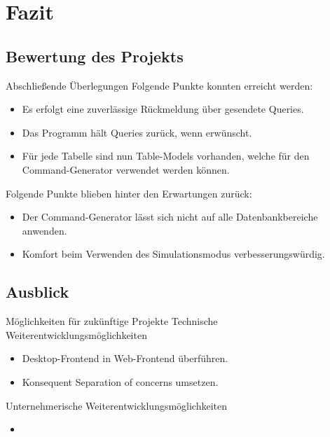 \documentclass[toc]{beamer}
\begin{document}
\section{Fazit}
    \subsection{Bewertung des Projekts}
        \begin{frame}{Abschließende Überlegungen}
            Folgende Punkte konnten erreicht werden:
                \begin{itemize}
                    \item Es erfolgt eine zuverlässige Rückmeldung über gesendete Queries.
                    \item Das Programm hält Queries zurück, wenn erwünscht.
                    \item Für jede Tabelle sind nun Table-Models vorhanden, welche für den Command-Generator verwendet werden können.
                \end{itemize}
            Folgende Punkte blieben hinter den Erwartungen zurück:
                \begin{itemize}
                    \item Der Command-Generator lässt sich nicht auf alle Datenbankbereiche anwenden.
                    \item Komfort beim Verwenden des Simulationsmodus verbesserungswürdig.
                \end{itemize}
            
    \end{frame}
    
    \subsection{Ausblick}
        \begin{frame}{Möglichkeiten für zukünftige Projekte}
            Technische Weiterentwicklungsmöglichkeiten
                 \begin{itemize}
                     \item Desktop-Frontend in Web-Frontend überführen.
                     \item Konsequent \glqq Separation of concerns\grqq{} umsetzen.
                 \end{itemize}
            Unternehmerische Weiterentwicklungsmöglichkeiten
                 \begin{itemize}
                     \item 
                 \end{itemize}
        \end{frame}
\end{document}
